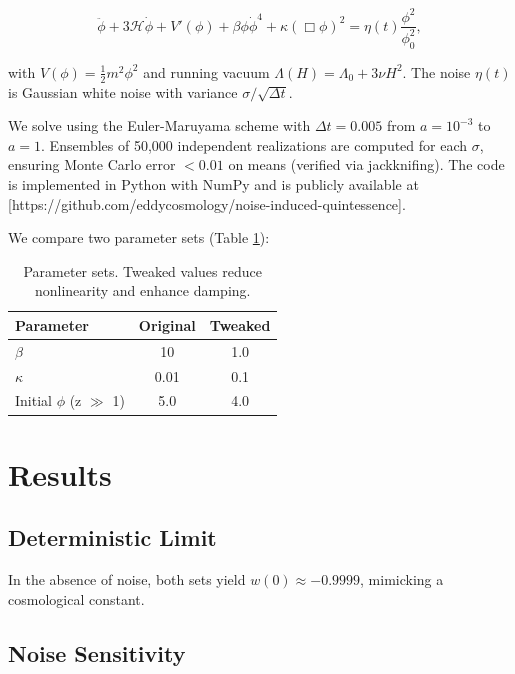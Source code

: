 \documentclass[preprint]{aastex7}
\begin{document}
\begin{equation}
\ddot{\phi} + 3\mathcal{H}\dot{\phi} + V'(\phi) + \beta \phi \dot{\phi}^4 + \kappa (\Box \phi)^2 = \eta(t) \frac{\phi^2}{\phi_0^2},
\end{equation}

with \( V(\phi) = \frac{1}{2} m^2 \phi^2 \) and running vacuum \( \Lambda(H) = \Lambda_0 + 3\nu H^2 \). The noise \( \eta(t) \) is Gaussian white noise with variance \( \sigma / \sqrt{\Delta t} \).

We solve using the Euler-Maruyama scheme with \( \Delta t = 0.005 \) from \( a = 10^{-3} \) to \( a=1 \). Ensembles of 50,000 independent realizations are computed for each \( \sigma \), ensuring Monte Carlo error \( < 0.01 \) on means (verified via jackknifing). The code is implemented in Python with NumPy and is publicly available at [https://github.com/eddycosmology/noise-induced-quintessence].

We compare two parameter sets (Table \ref{tab:params}):

\begin{table}[htbp]
\centering
\begin{tabular}{lcc}
\toprule
Parameter & Original & Tweaked \\
\midrule
\( \beta \) & 10 & 1.0 \\
\( \kappa \) & 0.01 & 0.1 \\
Initial \( \phi \) (z \( \gg \) 1) & 5.0 & 4.0 \\
\bottomrule
\end{tabular}
\caption{Parameter sets. Tweaked values reduce nonlinearity and enhance damping.}
\label{tab:params}
\end{table}

\section{Results}

\subsection{Deterministic Limit}

In the absence of noise, both sets yield \( w(0) \approx -0.9999 \), mimicking a cosmological constant.

\subsection{Noise Sensitivity}
\end{document}
